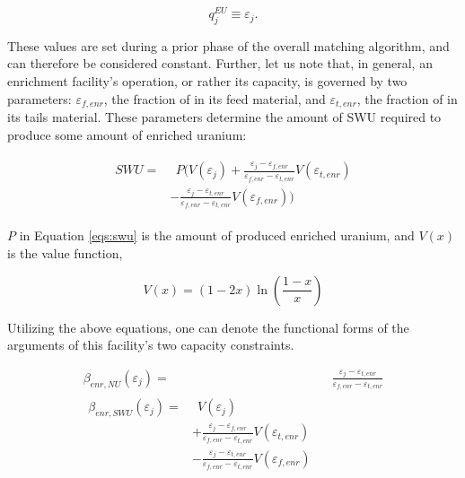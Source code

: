 \begin{equation}\label{eqs:enr-q-swu}
  q_{j}^{EU} \equiv \varepsilon_{j}.
\end{equation}

These values are set during a prior phase of the overall matching algorithm, and
can therefore be considered constant. Further, let us note that, in general, an
enrichment facility's operation, or rather its capacity, is governed by two
parameters: $\varepsilon_{f,enr}$, the fraction of  in its feed material, and
$\varepsilon_{t,enr}$, the fraction of  in its tails material. These parameters
determine the amount of SWU required to produce some amount of enriched uranium:

\begin{align}
\begin{split}
\label{eqs:swu}
SWU = & \:\: P ( V(\varepsilon_{j}) 
      + \frac{\varepsilon_{j} - \varepsilon_{f,enr}}
               {\varepsilon_{f,enr} - \varepsilon_{t,enr}} V(\varepsilon_{t,enr}) \\
      & - \frac{\varepsilon_{j} - \varepsilon_{t,enr}}
               {\varepsilon_{f,enr} - \varepsilon_{t,enr}} V(\varepsilon_{f,enr}) )
\end{split}
\end{align}

$P$ in Equation \ref{eqs:swu} is the amount of produced enriched uranium, and
$V(x)$ is the value function,

\begin{equation}\label{eqs:value}
  V(x) = (1-2x) \ln \left(\frac{1-x}{x}\right)
\end{equation}

Utilizing the above equations, one can denote the functional forms of the
arguments of this facility's two capacity constraints.

\begin{align}
\label{eqs:enr-prod-beta}
\beta_{enr,NU}(\varepsilon_{j}) = & \:\: \frac{\varepsilon_{j} - \varepsilon_{t,enr}}
                                      {\varepsilon_{f,enr} - \varepsilon_{t,enr}} \\
\begin{split}
\label{eqs:enr-swu-beta}
\beta_{enr,SWU}(\varepsilon_{j}) = & \:\: V(\varepsilon_{j}) \\
                         & + \frac{\varepsilon_{j} - \varepsilon_{f,enr}}
                                  {\varepsilon_{f,enr} - \varepsilon_{t,enr}} V(\varepsilon_{t,enr}) \\
                         & - \frac{\varepsilon_{j} - \varepsilon_{t,enr}}
                                  {\varepsilon_{f,enr} - \varepsilon_{t,enr}} V(\varepsilon_{f,enr})
\end{split}
\end{align}

